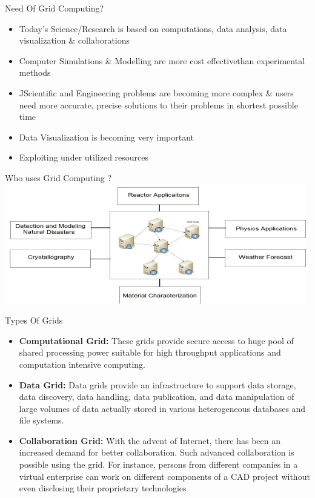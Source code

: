 \documentclass{SKP-beamer}
\begin{document}
\begin{frame}{ Need Of Grid Computing?}
	\begin{itemize}
		
		\item   Today’s Science/Research is based on computations, data analysis, data 
		visualization & collaborations
		\item Computer Simulations & Modelling are more cost effectivethan
		experimental methods
		\item  JScientific and Engineering problems are becoming more complex & users 
		need more accurate, precise solutions to their problems in shortest possible 
		time
		\item  Data Visualization is becoming very important
		\item Exploiting under utilized resources
		
	\end{itemize}
\end{frame}



\begin{frame}{Who uses Grid Computing ?}
	\includegraphics[scale=1.0]{5.png}
\end{frame}

\begin{frame}{ Types Of Grids}
	\begin{itemize}
		
		\item  \textbf{Computational Grid:} These grids provide secure access to huge pool of shared processing 
		power suitable for high throughput applications and computation intensive computing.
		\item \textbf{Data Grid:} Data grids provide an infrastructure to support data storage, data discovery, data 
		handling, data publication, and data manipulation of large volumes of data actually stored 
		in various heterogeneous databases and file systems.
		\item  \textbf{Collaboration Grid:} With the advent of Internet, there has been an increased demand for 
		better collaboration. Such advanced collaboration is possible using the grid. For instance, 
		persons from different companies in a virtual enterprise can work on different components of 
		a CAD project without even disclosing their proprietary technologies
		
	\end{itemize}
\end{frame}
\end{document}

